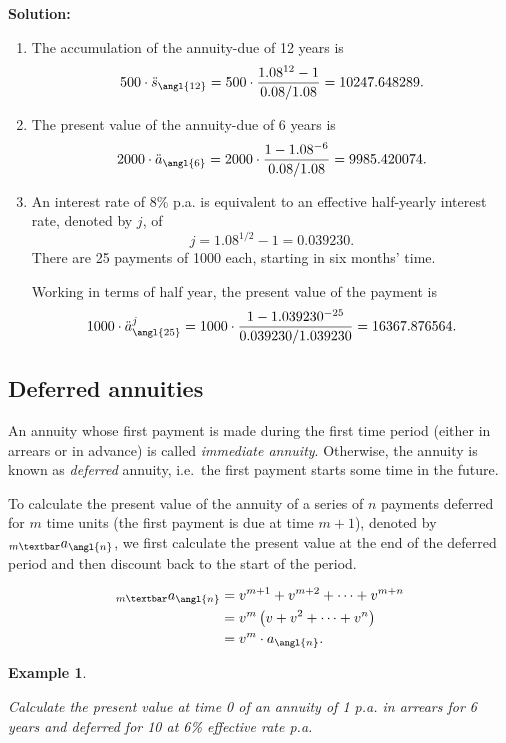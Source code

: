 \documentclass[
]{book}
\theoremstyle{definition}
\theoremstyle{definition}
\newtheorem{example}{Example}[chapter]
\theoremstyle{definition}
\theoremstyle{definition}
\theoremstyle{remark}
\begin{document}
\textbf{Solution:}

\begin{enumerate}
\def\labelenumi{\arabic{enumi}.}
\item
  The accumulation of the annuity-due of 12 years is
  \[500 \cdot \ddot{s}_\angl{12} = 500 \cdot \frac{1.08^{12} -1}{0.08/1.08} = 10247.648289.\]
\item
  The present value of the annuity-due of 6 years is
  \[2000 \cdot \ddot{a}_\angl{6} = 2000 \cdot \frac{1- 1.08^{-6}}{0.08/1.08} = 9985.420074.\]
\item
  An interest rate of 8\% p.a. is equivalent to an effective
  half-yearly interest rate, denoted by \(j\), of
  \[j = 1.08^{1/2} -1 = 0.039230.\] There are 25 payments of 1000
  each, starting in six months' time.

  Working in terms of half year, the present value of the payment is
  \[1000 \cdot \ddot{a}^j_\angl{25} = 1000 \cdot \frac{1 - 1.039230^{-25} }{0.039230/1.039230 } = 16367.876564.\]
\end{enumerate}

\hypertarget{deferred-annuities}{%
\subsection{Deferred annuities}\label{deferred-annuities}}

An annuity whose first payment is made during the first time period
(either in arrears or in advance) is called \emph{immediate annuity}.
Otherwise, the annuity is known as \emph{deferred} annuity, i.e.~the first
payment starts some time in the future.

To calculate the present value of the annuity of a series of \(n\)
payments deferred for \(m\) time units (the first payment is due at time
\(m+1\)), denoted by \(_{m \textbar}a_\angl{n}\), we first calculate the
present value at the end of the deferred period and then discount back
to the start of the period.

\[\begin{aligned}
    _{m \textbar} a_\angl{n}  &= v^{m+1} + v^{m+2} + \cdots +v^{m+n}  \\
    &= v^m  \left( v + v^2 + \cdots + v^n  \right) \\
    &= v^m \cdot  a_\angl{n}.\end{aligned}\]

\begin{example}
\protect\hypertarget{exm:unlabeled-div-33}{}\label{exm:unlabeled-div-33}

\emph{Calculate the present value at time 0 of an annuity of 1 p.a. in
arrears for 6 years and deferred for 10 at 6\% effective rate p.a.}

\end{example}
\end{document}
